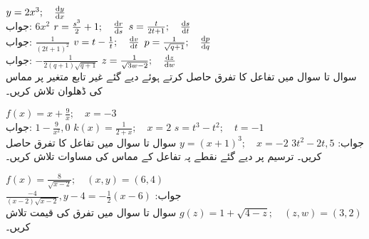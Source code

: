$y=2x^3;\quad \tfrac{\dif y}{\dif x}$\\
جواب:\quad
$6x^2$
$r=\tfrac{s^3}{2}+1;\quad \tfrac{\dif r}{\dif s}$
$s=\tfrac{t}{2t+1};\quad \tfrac{\dif s}{\dif t}$\\
جواب:\quad
$\tfrac{1}{(2t+1)^2}$
$v=t-\tfrac{1}{t};\quad \tfrac{\dif v}{\dif t}$
$p=\tfrac{1}{\sqrt{q+1}};\quad \tfrac{\dif p}{\dif q}$\\
جواب:\quad
 $-\tfrac{1}{2(q+1)\sqrt{q+1}}$
$z=\tfrac{1}{\sqrt{3w-2}};\quad \tfrac{\dif z}{\dif w}$
\\
سوال  تا سوال  میں تفاعل کا تفرق حاصل کرتے ہوئے دیے گئے غیر تابع متغیر پر مماس کی ڈھلوان تلاش کریں۔

$f(x)=x+\tfrac{9}{x};\quad x=-3$\\
جواب:\quad
$1-\tfrac{9}{x^2},0$
$k(x)=\tfrac{1}{2+x};\quad x=2$
$s=t^3-t^2;\quad t=-1$\\
جواب:\quad
$3t^2-2t,5$
$y=(x+1)^3;\quad x=-2$
سوال  تا سوال  میں تفاعل کا تفرق حاصل کریں۔ ترسیم پر دیے گئے نقطے پہ تفاعل کے مماس کی مساوات تلاش کریں۔

$f(x)=\tfrac{8}{\sqrt{x-2}};\quad (x,y)=(6,4)$\\
جواب:\quad
$\tfrac{-4}{(x-2)\sqrt{x-2}},y-4=-\tfrac{1}{2}(x-6)$
$g(z)=1+\sqrt{4-z};\quad (z,w)=(3,2)$
سوال  تا سوال  میں تفرق کی قیمت تلاش کریں۔


